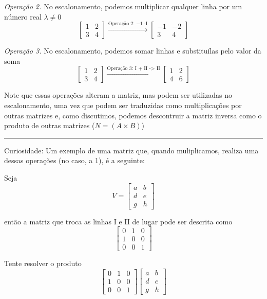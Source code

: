 \documentclass[
  letterpaper,
  DIV=11,
  numbers=noendperiod]{scrreprt}
\begin{document}
\emph{Operação 2.} No escalonamento, podemos multiplicar qualquer linha
por um número real \(\lambda \neq 0\) \[
\begin{bmatrix}
    1 & 2 \\
    3 & 4
\end{bmatrix} \stackrel{\text{Operação 2: $-1\cdot$I}}{\rightarrow}
\begin{bmatrix}
    -1 & -2 \\
    3& 4
\end{bmatrix}
\]

\emph{Operação 3.} No escalonamento, podemos somar linhas e substituílas
pelo valor da soma \[
\begin{bmatrix}
    1 & 2 \\
    3 & 4
\end{bmatrix} \stackrel{\text{Operação 3: I + II -> II}}{\rightarrow}
\begin{bmatrix}
    1 & 2 \\
    4 & 6
\end{bmatrix}
\]

Note que essas operações alteram a matriz, mas podem ser utilizadas no
escalonamento, uma vez que podem ser traduzidas como multiplicações por
outras matrizes e, como discutimos, podemos descontruir a matriz inversa
como o produto de outras matrizes (\(N=(A\times B)\))

\begin{center}\rule{0.5\linewidth}{0.5pt}\end{center}

Curiosidade: Um exemplo de uma matriz que, quando muliplicamos, realiza
uma dessas operações (no caso, a 1), é a seguinte:

Seja \[
V = \begin{bmatrix}
    a & b \\
    d & e \\
    g & h
\end{bmatrix}
\]

então a matriz que troca as linhas I e II de lugar pode ser descrita
como \[
\begin{bmatrix}
    0 & 1 & 0\\
    1 & 0 & 0\\
    0 & 0 & 1
\end{bmatrix}
\]

Tente resolver o produto \[
\begin{bmatrix}
    0 & 1 & 0\\
    1 & 0 & 0\\
    0 & 0 & 1
\end{bmatrix} 
\begin{bmatrix}
    a & b \\
    d & e \\
    g & h
\end{bmatrix}
\]
\end{document}

